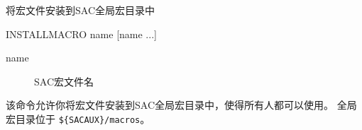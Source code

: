 \label{cmd:installmacro}

将宏文件安装到SAC全局宏目录中

\begin{SACSTX}
INSTALLMACRO name [name ...]
\end{SACSTX}

\begin{description}
\item [name] SAC宏文件名
\end{description}

该命令允许你将宏文件安装到SAC全局宏目录中，使得所有人都可以使用。
全局宏目录位于 \verb|${SACAUX}/macros|。

